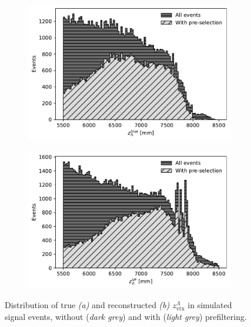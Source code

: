 \begin{figure}[t]
	\centering
	\begin{subfigure}{.45\textwidth}
		\includegraphics[width=\textwidth]{graphics/04-event_selection/Lambda_endvertex_z_true.pdf}
		\caption{}
		\label{fig:4:lz_vertex_true}
	\end{subfigure}
	\begin{subfigure}{.45\textwidth}
		\includegraphics[width=\textwidth]{graphics/04-event_selection/Lambda_endvertex_z.pdf}
		\caption{}
		\label{fig:4:lz_vertex_reco}
	\end{subfigure}
	\caption{Distribution of true \textit{(a)} and reconstructed \textit{(b)} $z_\text{vtx}^\Lambda$ in simulated \demonstratorshort signal events, without (\textit{dark grey}) and with (\textit{light grey}) prefiltering.}
	\label{fig:4:lz_vertex_distributions}
\end{figure}

